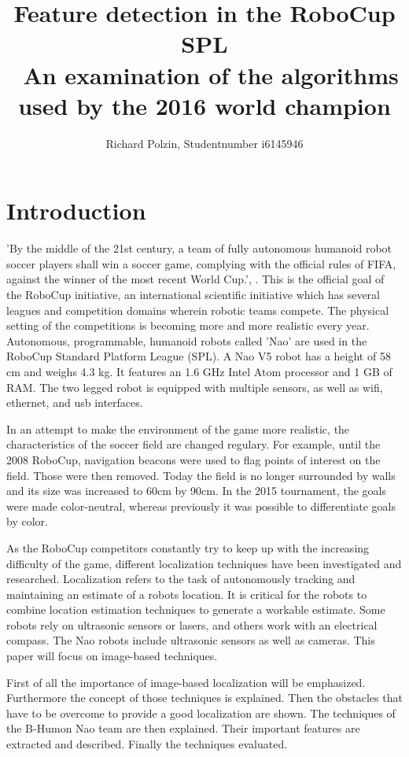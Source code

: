\documentclass[12pt, a4paper, doc]{apa6}
\author{Richard Polzin, Studentnumber i6145946}
\affiliation{\today, Academic Writing, Tutor: Denise McAllister}
\title{Feature detection in the RoboCup SPL \\\ \large{An examination of the algorithms used by the 2016 world champion}}
\begin{document}
  \maketitle
  \setlength{\parindent}{0pt}

  \section{Introduction}
  \noindent 'By the middle of the 21st century, a team of fully autonomous humanoid robot soccer players shall win a soccer game, complying with the official rules of FIFA, against the winner of the most recent World Cup.', \cite{Kitano95robocup:the}. This is the official goal of the RoboCup initiative, an international scientific initiative which has several leagues and competition domains wherein robotic teams compete. The physical setting of the competitions is becoming more and more realistic every year. Autonomous, programmable, humanoid robots called 'Nao' are used in the RoboCup Standard Platform League (SPL). A Nao V5 robot has a height of 58 cm and weighs 4.3 kg. It features an 1.6 GHz Intel Atom processor and 1 GB of RAM. The two legged robot is equipped with multiple sensors, as well as wifi, ethernet, and usb interfaces.

  In an attempt to make the environment of the game more realistic, the characteristics of the soccer field are changed regulary. For example, until the 2008 RoboCup, navigation beacons were used to flag points of interest on the field. Those were then removed. Today the field is no longer surrounded by walls and its size was increased to 60cm by 90cm. In the 2015 tournament, the goals were made color-neutral, whereas previously it was possible to differentiate goals by color.

  As the RoboCup competitors constantly try to keep up with the increasing difficulty of the game, different localization techniques have been investigated and researched. Localization refers to the task of autonomously tracking and maintaining an estimate of a robots location. It is critical for the robots to combine location estimation techniques to generate a workable estimate. Some robots rely on ultrasonic sensors or lasers, and others work with an electrical compass. The Nao robots include ultrasonic sensors as well as cameras. This paper will focus on image-based techniques.

  First of all the importance of image-based localization will be emphasized. Furthermore the concept of those techniques is explained. Then the obstacles that have to be overcome to provide a good localization are shown. The techniques of the B-Humon Nao team are then explained. Their important features are extracted and described. Finally the techniques evaluated.
\end{document}

